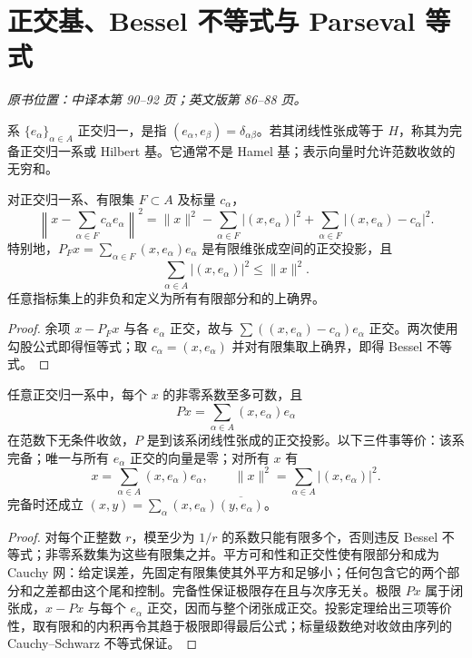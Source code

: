 \section{正交基、Bessel 不等式与 Parseval 等式}\label{sec:yosida-03-04}
\noindent\textit{原书位置：中译本第 90--92 页；英文版第 86--88 页。}

\begin{definition}
系 $\{e_\alpha\}_{\alpha\in A}$ 正交归一，是指 $(e_\alpha,e_\beta)=\delta_{\alpha\beta}$。若其闭线性张成等于 $H$，称其为完备正交归一系或 Hilbert 基。它通常不是 Hamel 基；表示向量时允许范数收敛的无穷和。
\end{definition}

\begin{theorem}\label{thm:y3-bessel}
对正交归一系、有限集 $F\subset A$ 及标量 $c_\alpha$，
\[
 \left\|x-\sum_{\alpha\in F}c_\alpha e_\alpha\right\|^2
 =\|x\|^2-\sum_{\alpha\in F}|(x,e_\alpha)|^2
   +\sum_{\alpha\in F}|(x,e_\alpha)-c_\alpha|^2.
\]
特别地，$P_Fx=\sum_{\alpha\in F}(x,e_\alpha)e_\alpha$ 是有限维张成空间的正交投影，且
\[
 \sum_{\alpha\in A}|(x,e_\alpha)|^2\le\|x\|^2.
\]
任意指标集上的非负和定义为所有有限部分和的上确界。
\end{theorem}
\begin{proof}
余项 $x-P_Fx$ 与各 $e_\alpha$ 正交，故与 $\sum((x,e_\alpha)-c_\alpha)e_\alpha$ 正交。两次使用勾股公式即得恒等式；取 $c_\alpha=(x,e_\alpha)$ 并对有限集取上确界，即得 Bessel 不等式。
\end{proof}

\begin{theorem}\label{thm:y3-parseval}
任意正交归一系中，每个 $x$ 的非零系数至多可数，且
\[
 Px=\sum_{\alpha\in A}(x,e_\alpha)e_\alpha
\]
在范数下无条件收敛，$P$ 是到该系闭线性张成的正交投影。以下三件事等价：该系完备；唯一与所有 $e_\alpha$ 正交的向量是零；对所有 $x$ 有
\[
 x=\sum_{\alpha\in A}(x,e_\alpha)e_\alpha,\qquad
 \|x\|^2=\sum_{\alpha\in A}|(x,e_\alpha)|^2.
\]
完备时还成立 $(x,y)=\sum_\alpha(x,e_\alpha)\overline{(y,e_\alpha)}$。
\end{theorem}
\begin{proof}
对每个正整数 $r$，模至少为 $1/r$ 的系数只能有限多个，否则违反 Bessel 不等式；非零系数集为这些有限集之并。平方可和性和正交性使有限部分和成为 Cauchy 网：给定误差，先固定有限集使其外平方和足够小；任何包含它的两个部分和之差都由这个尾和控制。完备性保证极限存在且与次序无关。极限 $Px$ 属于闭张成，$x-Px$ 与每个 $e_\alpha$ 正交，因而与整个闭张成正交。投影定理给出三项等价性，取有限和的内积再令其趋于极限即得最后公式；标量级数绝对收敛由序列的 Cauchy--Schwarz 不等式保证。
\end{proof}

